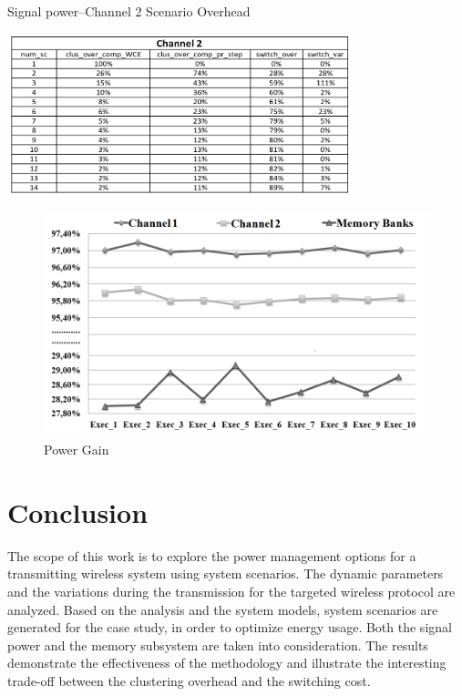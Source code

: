 \begin{table}
\centering
	\caption{Signal power–Channel 2 Scenario Overhead}
	\label{tab:F3}
	\includegraphics[width=0.75\textwidth]{F/tab3.png}
\end{table} 

\begin{figure}
\centering
\includegraphics[width=\textwidth]{F/image15.png}
\caption{Power Gain}
\label{fig:F8}
\end{figure}	 

\section{Conclusion} 

The scope of this work is to explore the power management options for a transmitting wireless system using system scenarios. The dynamic parameters and the variations during the transmission for the targeted wireless protocol are analyzed. Based on the analysis and the system models, system scenarios are generated for the case study, in order to optimize energy usage. Both the signal power and the memory subsystem are taken into consideration. The results demonstrate the effectiveness of the methodology and illustrate the interesting trade-off between the clustering overhead and the switching cost. 
	


	
	
